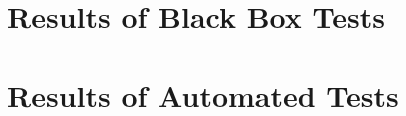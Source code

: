 \newpage
\appendix
\section{Results of Black Box Tests}
\label{app:blackboxtests}
\section{Results of Automated Tests}
\label{app:automatedtests}
